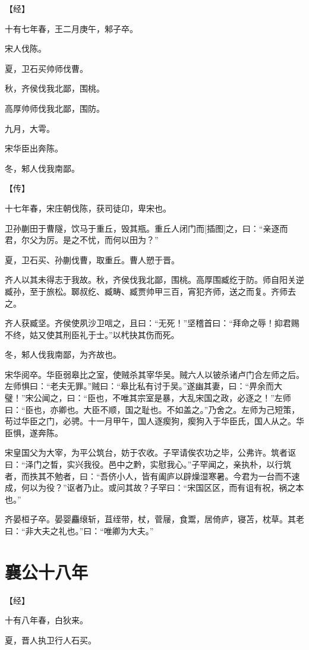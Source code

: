 \documentclass[a4paper,12pt,UTF8,twoside]{ctexbook}
\begin{document}
【经】

十有七年春，王二月庚午，邾子卒。

宋人伐陈。

夏，卫石买帅师伐曹。

秋，齐侯伐我北鄙，围桃。

高厚帅师伐我北鄙，围防。

九月，大雩。

宋华臣出奔陈。

冬，邾人伐我南鄙。

【传】

十七年春，宋庄朝伐陈，获司徒卬，卑宋也。

卫孙蒯田于曹隧，饮马于重丘，毁其瓶。重丘人闭门而[插图]之，曰：“亲逐而君，尔父为厉。是之不忧，而何以田为？”

夏，卫石买、孙蒯伐曹，取重丘。曹人愬于晋。

齐人以其未得志于我故。秋，齐侯伐我北鄙，围桃。高厚围臧纥于防。师自阳关逆臧孙，至于旅松。郰叔纥、臧畴、臧贾帅甲三百，宵犯齐师，送之而复。齐师去之。

齐人获臧坚。齐侯使夙沙卫唁之，且曰：“无死！”坚稽首曰：“拜命之辱！抑君赐不终，姑又使其刑臣礼于士。”以杙抉其伤而死。

冬，邾人伐我南鄙，为齐故也。

宋华阅卒。华臣弱皋比之室，使贼杀其宰华吴。贼六人以铍杀诸卢门合左师之后。左师惧曰：“老夫无罪。”贼曰：“皋比私有讨于吴。”遂幽其妻，曰：“畀余而大璧！”宋公闻之，曰：“臣也，不唯其宗室是暴，大乱宋国之政，必逐之！”左师曰：“臣也，亦卿也。大臣不顺，国之耻也。不如盖之。”乃舍之。左师为己短策，苟过华臣之门，必骋。十一月甲午，国人逐瘈狗，瘈狗入于华臣氏，国人从之。华臣惧，遂奔陈。

宋皇国父为大宰，为平公筑台，妨于农收。子罕请俟农功之毕，公弗许。筑者讴曰：“泽门之晳，实兴我役。邑中之黔，实慰我心。”子罕闻之，亲执朴，以行筑者，而抶其不勉者，曰：“吾侪小人，皆有阖庐以辟燥湿寒暑。今君为一台而不速成，何以为役？”讴者乃止。或问其故？子罕曰：“宋国区区，而有诅有祝，祸之本也。”

齐晏桓子卒。晏婴麤缞斩，苴绖带，杖，菅屦，食鬻，居倚庐，寝苫，枕草。其老曰：“非大夫之礼也。”曰：“唯卿为大夫。”

\chapter{襄公十八年}


【经】

十有八年春，白狄来。

夏，晋人执卫行人石买。
\end{document}
